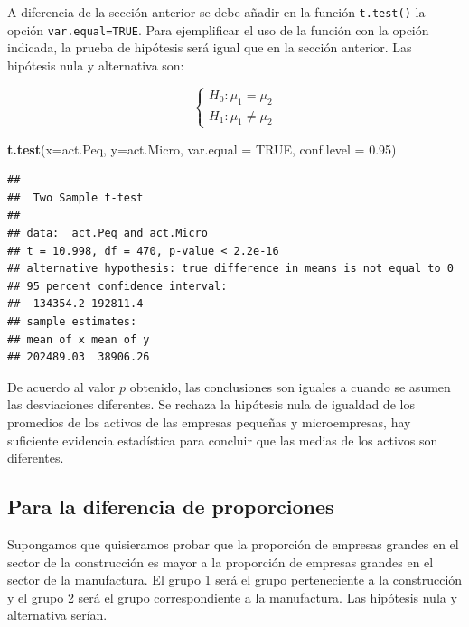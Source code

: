 \documentclass[
]{krantz}
\makeatletter
\newenvironment{Shaded}{\begin{snugshade}}{\end{snugshade}}
\newcommand{\DataTypeTok}[1]{\textcolor[rgb]{0.27,0.27,0.27}{#1}}
\newcommand{\FloatTok}[1]{\textcolor[rgb]{0.06,0.06,0.06}{#1}}
\newcommand{\KeywordTok}[1]{\textcolor[rgb]{0.27,0.27,0.27}{\textbf{#1}}}
\newcommand{\NormalTok}[1]{#1}
\newcommand{\OtherTok}[1]{\textcolor[rgb]{0.37,0.37,0.37}{#1}}
\newenvironment{kframe}{%
\medskip{}
\setlength{\fboxsep}{.8em}
 \def\at@end@of@kframe{}%
 \ifinner\ifhmode%
  \def\at@end@of@kframe{\end{minipage}}%
  \begin{minipage}{\columnwidth}%
 \fi\fi%
 \def\FrameCommand##1{\hskip\@totalleftmargin \hskip-\fboxsep
 \colorbox{shadecolor}{##1}\hskip-\fboxsep
     \hskip-\linewidth \hskip-\@totalleftmargin \hskip\columnwidth}%
 \MakeFramed {\advance\hsize-\width
   \@totalleftmargin\z@ \linewidth\hsize
   \@setminipage}}%
 {\par\unskip\endMakeFramed%
 \at@end@of@kframe}
\renewenvironment{Shaded}{\begin{kframe}}{\end{kframe}}
\makeatother
\begin{document}
A diferencia de la sección anterior se debe añadir en la función \texttt{t.test()} la opción \texttt{var.equal=TRUE}. Para ejemplificar el uso de la función con la opción indicada, la prueba de hipótesis será igual que en la sección anterior. Las hipótesis nula y alternativa son:

\begin{equation} 
\begin{cases} 
H_0: \mu_1 = \mu_2 \\ 
H_1: \mu_1 \neq \mu_2
\end{cases} 
\end{equation}

\begin{Shaded}
\begin{Highlighting}[]
\KeywordTok{t.test}\NormalTok{(}\DataTypeTok{x=}\NormalTok{act.Peq, }\DataTypeTok{y=}\NormalTok{act.Micro, }\DataTypeTok{var.equal =} \OtherTok{TRUE}\NormalTok{,}
       \DataTypeTok{conf.level =} \FloatTok{0.95}\NormalTok{)}
\end{Highlighting}
\end{Shaded}

\begin{verbatim}
## 
##  Two Sample t-test
## 
## data:  act.Peq and act.Micro
## t = 10.998, df = 470, p-value < 2.2e-16
## alternative hypothesis: true difference in means is not equal to 0
## 95 percent confidence interval:
##  134354.2 192811.4
## sample estimates:
## mean of x mean of y 
## 202489.03  38906.26
\end{verbatim}

De acuerdo al valor \(p\) obtenido, las conclusiones son iguales a cuando se asumen las desviaciones diferentes. Se rechaza la hipótesis nula de igualdad de los promedios de los activos de las empresas pequeñas y microempresas, hay suficiente evidencia estadística para concluir que las medias de los activos son diferentes.

\hypertarget{para-la-diferencia-de-proporciones}{%
\subsection{Para la diferencia de proporciones}\label{para-la-diferencia-de-proporciones}}

Supongamos que quisieramos probar que la proporción de empresas grandes en el sector de la construcción es mayor a la proporción de empresas grandes en el sector de la manufactura. El grupo 1 será el grupo perteneciente a la construcción y el grupo 2 será el grupo correspondiente a la manufactura. Las hipótesis nula y alternativa serían.
\end{document}
